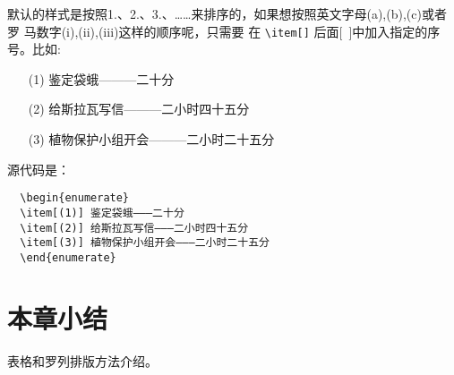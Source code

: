 默认的样式是按照1.、2.、3.、……来排序的，如果想按照英文字母(a),(b),(c)或者罗
马数字(i),(ii),(iii)这样的顺序呢，只需要
在 \verb|\item[]| 后面[~]中加入指定的序号。比如:
\begin{enumerate}
\item[(1)] 鉴定袋蛾———二十分
\item[(2)] 给斯拉瓦写信———二小时四十五分
\item[(3)] 植物保护小组开会———二小时二十五分
\end{enumerate}
源代码是：
\begin{lstlisting}
  \begin{enumerate}
  \item[(1)] 鉴定袋蛾———二十分
  \item[(2)] 给斯拉瓦写信———二小时四十五分
  \item[(3)] 植物保护小组开会———二小时二十五分
  \end{enumerate}
\end{lstlisting}

\section*{本章小结}
表格和罗列排版方法介绍。
